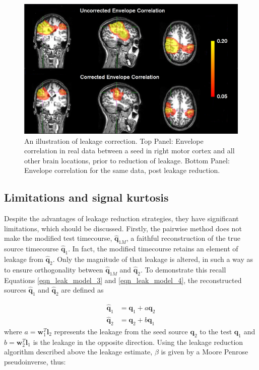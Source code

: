 \begin{figure}[h!]
	\begin{center}
		\includegraphics[width=\linewidth]{./images/chapter3/Figure_2.png}\caption{An illustration of leakage correction. Top Panel: Envelope correlation in real data between a seed in right motor cortex and all other brain locations, prior to reduction of leakage. Bottom Panel: Envelope correlation for the same data, post leakage reduction.\label{figure_3_2}}
	\end{center}
\end{figure}


\subsection{Limitations and signal kurtosis}

Despite the advantages of leakage reduction strategies, they have significant limitations, which should be discussed. Firstly, the pairwise method does not make the modified test timecourse, $\hat{\mathbf{q}}_{1M}$, a faithful reconstruction of the true source timecourse $\hat{\mathbf{q}}_1$. In fact, the modified timecourse retains an element of leakage from $\hat{\mathbf{q}}_2$. Only the magnitude of that leakage is altered, in such a way as to ensure orthogonality between $\hat{\mathbf{q}}_{1M}$ and $\hat{\mathbf{q}}_2$. To demonstrate this recall Equations \ref{eqn_leak_model_3} and \ref{eqn_leak_model_4}, the reconstructed sources $\hat{\mathbf{q}}_1$ and $\hat{\mathbf{q}}_2$ are defined as

\begin{equation}
\begin{aligned}
\hat{\mathbf{q}}_1 &=\mathbf{q}_1 +a\mathbf{q}_2 \\
\hat{\mathbf{q}}_2 &=\mathbf{q}_2 +b\mathbf{q}_1
\end{aligned}
\end{equation} where $a = \mathbf{w}^T_1\mathbf{l}_2$ represents the leakage from the seed source $\mathbf{q}_2$ to the test $\mathbf{q}_1$ and $b = \mathbf{w}^T_2\mathbf{l}_1$ is the leakage in the opposite direction. Using the leakage reduction algorithm described above the leakage estimate, $\beta$ is given by a Moore Penrose pseudoinverse, thus:

